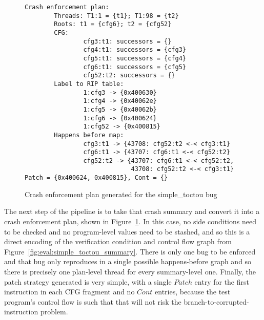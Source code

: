 \begin{figure}
  \begin{minipage}{100mm}
\begin{verbatim}
Crash enforcement plan:
        Threads: T1:1 = {t1}; T1:98 = {t2}
        Roots: t1 = {cfg6}; t2 = {cfg52}
        CFG:
                cfg3:t1: successors = {}
                cfg4:t1: successors = {cfg3}
                cfg5:t1: successors = {cfg4}
                cfg6:t1: successors = {cfg5}
                cfg52:t2: successors = {}
        Label to RIP table:
                1:cfg3 -> {0x400630}
                1:cfg4 -> {0x40062e}
                1:cfg5 -> {0x40062b}
                1:cfg6 -> {0x400624}
                1:cfg52 -> {0x400815}
        Happens before map:
                cfg3:t1 -> {43708: cfg52:t2 <-< cfg3:t1}
                cfg6:t1 -> {43707: cfg6:t1 <-< cfg52:t2}
                cfg52:t2 -> {43707: cfg6:t1 <-< cfg52:t2,
                             43708: cfg52:t2 <-< cfg3:t1}
Patch = {0x400624, 0x400815}, Cont = {}
\end{verbatim}
  \end{minipage}
  \caption{Crash enforcement plan generated for the simple\_toctou
    bug} 
  \label{fig:eval:simple_toctou_cep}
\end{figure}

The next step of the pipeline is to take that crash summary and
convert it into a crash enforcement plan, shown in
Figure~\ref{fig:eval:simple_toctou_cep}.  In this case, no side
conditions need to be checked and no program-level values need to be
stashed, and so this is a direct encoding of the verification
condition and control flow graph from
Figure~\ref{fig:eval:simple_toctou_summary}.  There is only one bug to
be enforced and that bug only reproduces in a single possible
happens-before graph and so there is precisely one plan-level thread
for every summary-level one.  Finally, the patch
strategy generated is very simple, with a single $Patch$ entry for the
first instruction in each CFG fragment and no $Cont$ entries, because
the test program's control flow is such that that will not risk the
branch-to-corrupted-instruction problem.



